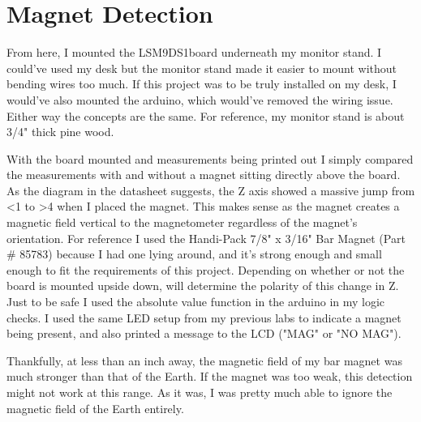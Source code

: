 \documentclass[prb,preprint]{revtex4-1}
\newcommand{\dev}{LSM9DS1} %
\begin{document}
\section{Magnet Detection}
From here, I mounted the \dev board underneath my monitor stand. I could've used my desk but the monitor stand made it easier to mount without bending wires too much. If this project was to be truly installed on my desk, I would've also mounted the arduino, which would've removed the wiring issue. Either way the concepts are the same. For reference, my monitor stand is about 3/4" thick pine wood. 

With the board mounted and measurements being printed out I simply compared the measurements with and without a magnet sitting directly above the board. As the diagram in the datasheet suggests, the Z axis showed a massive jump from <1 to >4 when I placed the magnet. This makes sense as the magnet creates a magnetic field vertical to the magnetometer regardless of the magnet's orientation. For reference I used the Handi-Pack 7/8" x 3/16" Bar Magnet (Part \# 85783) because I had one lying around, and it's strong enough and small enough to fit the requirements of this project. Depending on whether or not the board is mounted upside down, will determine the polarity of this change in Z. Just to be safe I used the absolute value function in the arduino in my logic checks. I used the same LED setup from my previous labs to indicate a magnet being present, and also printed a message to the LCD ("MAG" or "NO MAG").

Thankfully, at less than an inch away, the magnetic field of my bar magnet was much stronger than that of the Earth. If the magnet was too weak, this detection might not work at this range. As it was, I was pretty much able to ignore the magnetic field of the Earth entirely.
\end{document}
